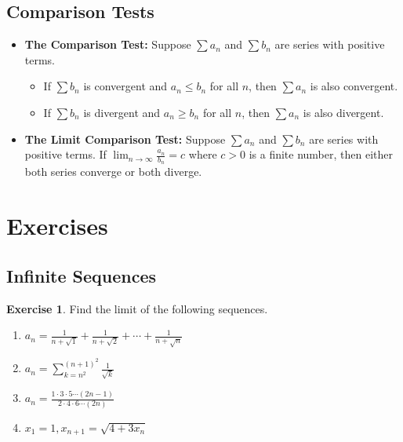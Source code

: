 \documentclass[11pt]{article}
\theoremstyle{definition}
\newtheorem{exercise}{Exercise}[section]
\begin{document}
\subsection{Comparison Tests}
\begin{itemize}
    \item \textbf{The Comparison Test:} Suppose $\sum a_n$ and $\sum b_n$ are series with positive terms.
        \begin{itemize}
            \item If $\sum b_n$ is convergent and $a_n \le b_n$ for all $n$, then $\sum a_n$ is also convergent.
            \item If $\sum b_n$ is divergent and $a_n \ge b_n$ for all $n$, then $\sum a_n$ is also divergent.
        \end{itemize}
    \item \textbf{The Limit Comparison Test:} Suppose $\sum a_n$ and $\sum b_n$ are series with positive terms. If $\lim_{n \to \infty} \frac{a_n}{b_n} = c$ where $c > 0$ is a finite number, then either both series converge or both diverge.
\end{itemize}

\newpage

\section{Exercises}

\subsection{Infinite Sequences}

\begin{exercise}
Find the limit of the following sequences.
\begin{enumerate}
    \item $\displaystyle a_n = \frac{1}{n+\sqrt{1}} + \frac{1}{n+\sqrt{2}} + \cdots + \frac{1}{n+\sqrt{n}}$
    \item $\displaystyle a_n = \sum_{k=n^2}^{(n+1)^2} \frac{1}{\sqrt{k}}$
    \item $\displaystyle a_n = \frac{1\cdot 3\cdot 5 \cdots (2n-1)}{2\cdot 4\cdot 6 \cdots (2n)}$
    \item $\displaystyle x_1=1, x_{n+1}=\sqrt{4+3x_n}$
\end{enumerate}
\end{exercise}
\end{document}
